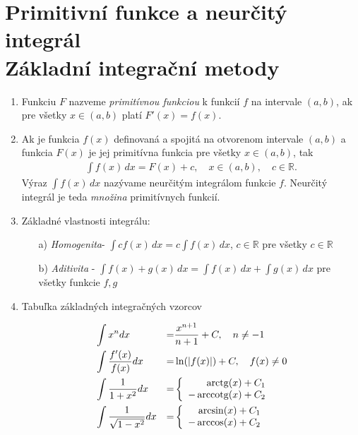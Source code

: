 \section{Primitivní funkce a neurčitý integrál \\ Základní integrační metody}


\begin{enumerate}
\item Funkciu $F$ nazveme \textit{primitívnou funkciou} k funkcií $f$ na intervale $(a,b)$, ak pre všetky $x \in (a,b)$ platí
$F'(x)=f(x)$.
\item Ak je funkcia $f(x)$ definovaná a spojitá na otvorenom intervale $(a,b)$ a funkcia $F(x)$ je jej primitívna funkcia pre všetky $x \in (a,b)$, tak
\begin{align*}
\int f(x) \,dx = F(x)+c, \quad x \in (a,b), \quad c \in \mathbb{R}.
\end{align*}
Výraz $\int f(x) \,dx$ nazývame neurčitým integrálom funkcie $f$. Neurčitý integrál je teda \textit{množina} primitívnych funkcií.
\item Základné vlastnosti integrálu:
\begin{enumerate}
\item[a)]{\textit{Homogenita}\quad - \quad  $\int cf(x) \,dx=c\int f(x) \,dx$, $c \in \mathbb{R}$ pre všetky $c \in \mathbb{R}$ }
\item[b)]{\textit{Aditivita} \quad - \quad $\int f(x)+g(x) \,dx=\int f(x) \,dx+\int g(x) \,dx$ pre všetky funkcie $f,g$  }
\end{enumerate}
\item Tabuľka základných integračných vzorcov \\
\begin{minipage}[t]{0.40\linewidth}
\begin{align*}
&\int x^n dx &=&\frac{x^{n+1}}{n+1} + C, \quad n \neq -1 \\
&\int \frac{f'(x)}{f(x)} dx &=&\ln(|f(x)|) + C, \quad f(x) \neq 0 \\
&\int \frac{1}{1+x^2} dx &=&\left\{ \begin{array}{r@{\quad}c}
    \arctan(x) + C_1 \\
    -\arccotg(x) + C_2 \\ \end{array} \right. \\
&\int \frac{1}{\sqrt{1-x^2}} dx &=&\left\{ \begin{array}{r@{\quad}c}
    \arcsin(x) + C_1 \\
    -\arccos(x) + C_2 \\ \end{array} \right. \\

\end{align*}
\end{minipage}
\end{enumerate}
